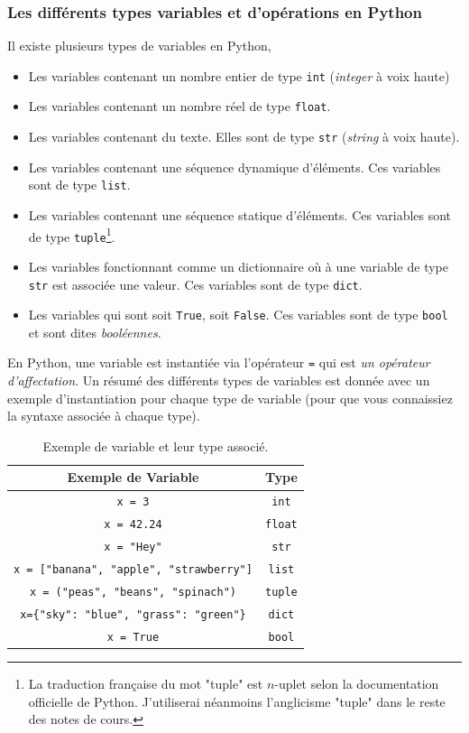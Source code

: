 \documentclass[titlepage]{article}
\theoremstyle{cleanremark}
\begin{document}
\subsubsection{Les différents types variables et d'opérations en Python}
Il existe plusieurs types de variables en Python, 
\begin{itemize}
    \item Les variables contenant un nombre entier de type \texttt{int} (\textit{integer} à voix haute)  
    \item Les variables contenant un nombre réel de type \texttt{float}.
    \item Les variables contenant du texte. Elles sont de type \texttt{str} (\textit{string} à voix haute).
    \item Les variables contenant une séquence dynamique d'éléments. Ces variables sont de type \texttt{list}. 
    \item Les variables contenant une séquence statique d'éléments. Ces variables sont de type \texttt{tuple}\footnote{La traduction française du mot "tuple" est $n$-uplet selon la documentation officielle de Python. J'utiliserai néanmoins l'anglicisme "tuple" dans le reste des notes de cours.}.
    \item Les variables fonctionnant comme un dictionnaire où à une variable de type \texttt{str} est associée une valeur. Ces variables sont de type \texttt{dict}.
    \item Les variables qui sont soit \texttt{True}, soit \texttt{False}. Ces variables sont de type \texttt{bool} et sont dites \textit{booléennes}.
\end{itemize}

En Python, une variable est instantiée via l'opérateur \texttt{=} qui est \textit{un opérateur d'affectation}. Un résumé des différents types de variables est donnée  avec un exemple d'instantiation pour chaque type de variable (pour que vous connaissiez la syntaxe associée à chaque type).

\begin{table}[h!]
    \centering
    \begin{tabular}{c|c}
         Exemple de Variable & Type  \\
        \hline 
        \hline
        \texttt{x = 3}       & \texttt{int}\\
        \texttt{x = 42.24}       & \texttt{float}\\
        \texttt{x = "Hey"}       & \texttt{str}\\
        \texttt{x = ["banana", "apple", "strawberry"]}       & \texttt{list}\\
        \texttt{x = ("peas", "beans", "spinach")}       & \texttt{tuple}\\
        \texttt{x=\{"sky": "blue", "grass": "green"\}}       & \texttt{dict}\\
        \texttt{x = True}       & \texttt{bool}
    \end{tabular}
    \caption{Exemple de variable et leur type associé.}
    \label{tab:python_variables}
\end{table}
\end{document}
